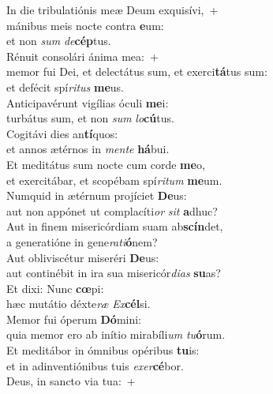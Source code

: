 \evenverse In die tribulatiónis meæ Deum exquisívi,~+\\\evenverse  mánibus meis nocte contra \textbf{e}um:~\*\\
\evenverse et non \textit{sum} \textit{de}\textbf{cép}tus.\\
\oddverse Rénuit consolári ánima mea:~+\\
\oddverse  memor fui Dei, et delectátus sum, et exerci\textbf{tá}tus sum:~\*\\
\oddverse et defécit spí\textit{ri}\textit{tus} \textbf{me}us.\\
\evenverse Anticipavérunt vigílias óculi \textbf{me}i:~\*\\
\evenverse turbátus sum, et non \textit{sum} \textit{lo}\textbf{cú}tus.\\
\oddverse Cogitávi dies an\textbf{tí}quos:~\*\\
\oddverse et annos ætérnos in \textit{men}\textit{te} \textbf{há}bui.\\
\evenverse Et meditátus sum nocte cum corde \textbf{me}o,~\*\\
\evenverse et exercitábar, et scopébam spí\textit{ri}\textit{tum} \textbf{me}um.\\
\oddverse Numquid in ætérnum projíciet \textbf{De}us:~\*\\
\oddverse aut non appónet ut complacíti\textit{or} \textit{sit} \textbf{a}dhuc?\\
\evenverse Aut in finem misericórdiam suam ab\textbf{scín}det,~\*\\
\evenverse a generatióne in gene\textit{ra}\textit{ti}\textbf{ó}nem?\\
\oddverse Aut obliviscétur miseréri \textbf{De}us:~\*\\
\oddverse aut continébit in ira sua misericór\textit{di}\textit{as} \textbf{su}as?\\
\evenverse Et dixi: Nunc \textbf{cœ}pi:~\*\\
\evenverse hæc mutátio déxte\textit{ræ} \textit{Ex}\textbf{cél}si.\\
\oddverse Memor fui óperum \textbf{Dó}mini:~\*\\
\oddverse quia memor ero ab inítio mirabíli\textit{um} \textit{tu}\textbf{ó}rum.\\
\evenverse Et meditábor in ómnibus opéribus \textbf{tu}is:~\*\\
\evenverse et in adinventiónibus tuis \textit{e}\textit{xer}\textbf{cé}bor.\\
\oddverse Deus, in sancto via tua:~+\\

